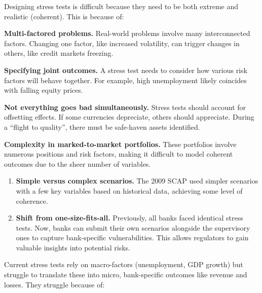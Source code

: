 Designing stress tests is difficult because they need to be both extreme and
realistic (coherent). This is because of:

\begin{lettered}
\item \textbf{Multi-factored problems.} Real-world problems involve many
interconnected factors. Changing one factor, like increased volatility, can
trigger changes in others, like credit markets freezing.
\item \textbf{Specifying joint outcomes.} A stress test needs to consider how
various risk factors will behave together. For example, high unemployment likely
coincides with falling equity prices.
\item \textbf{Not everything goes bad simultaneously.} Stress tests should account
for offsetting effects. If some currencies depreciate, others should appreciate.
During a ``flight to quality'', there must be safe-haven assets identified.
\item \textbf{Complexity in marked-to-market portfolios.} These portfolios involve
numerous positions and risk factors, making it difficult to model coherent
outcomes due to the sheer number of variables.
\end{lettered}


\begin{enumerate}
\item[\textcolor{rust}{\sffamily\bfseries 1.}] \textbf{Simple versus complex
scenarios.} The 2009 SCAP used simpler scenarios with a few key variables based on
historical data, achieving some level of coherence.
\item[\textcolor{rust}{\sffamily\bfseries 2.}] \textbf{Shift from
one-size-fits-all.} Previously, all banks faced identical stress tests. Now, banks
can submit their own scenarios alongside the supervisory ones to capture
bank-specific vulnerabilities. This allows regulators to gain valuable insights
into potential risks.
\end{enumerate}



Current stress tests rely on macro-factors (unemployment, GDP growth) but struggle
to translate these into micro, bank-specific outcomes like revenue and losses.
They struggle because of:

